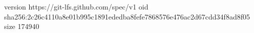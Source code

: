 version https://git-lfs.github.com/spec/v1
oid sha256:2c26c4110a8e01b995c1891ededba8fefe7868576e476ac2d67cdd34f8ad8f05
size 174940
